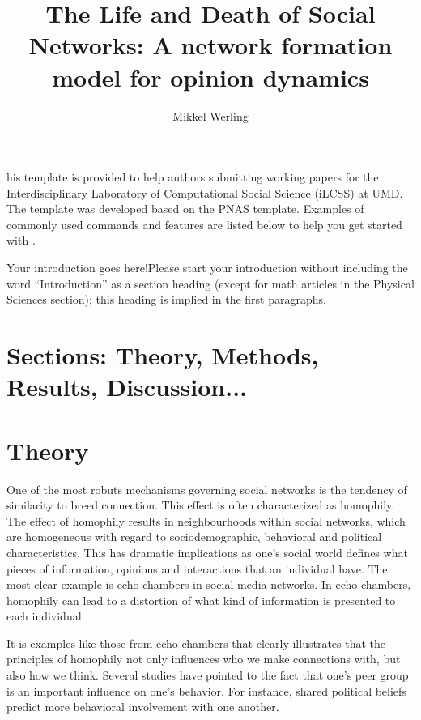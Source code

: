 \documentclass[9pt,twocolumn,twoside]{ilcss}
\title{The Life and Death of Social Networks: A network formation model for opinion dynamics}
\author{Mikkel Werling}
\affil[a]{Aarhus University}
\affil[b]{University of California, Merced}
\begin{document}
\maketitle
\thispagestyle{firststyle}


his template is provided to help authors submitting working papers for the Interdisciplinary Laboratory of Computational Social Science (iLCSS) at UMD. The template was developed based on the PNAS template. Examples of commonly used commands and features are listed below to help you get started with .

Your introduction goes here!Please start your introduction without including the word ``Introduction'' as a section heading (except for math articles in the Physical Sciences section); this heading is implied in the first paragraphs. 

\section*{Sections: Theory, Methods, Results, Discussion...}

\section{Theory}

One of the most robuts mechanisms governing social networks is the tendency of similarity to breed connection. 
This effect is often characterized as homophily. 
The effect of homophily results in neighbourhoods within social networks, which are homogeneous with regard to sociodemographic, behavioral and political characteristics. 
This has dramatic implications as one's social world defines what pieces of information, opinions and interactions that an individual have. 
The most clear example is echo chambers in social media networks. 
In echo chambers, homophily can lead to a distortion of what kind of information is presented to each individual. 

It is examples like those from echo chambers that clearly illustrates that the principles of homophily not only influences who we make connections with, but also how we think. 
Several studies have pointed to the fact that one's peer group is an important influence on one's behavior. 
For instance, shared political beliefs predict more behavioral involvement with one another.
\end{document}
